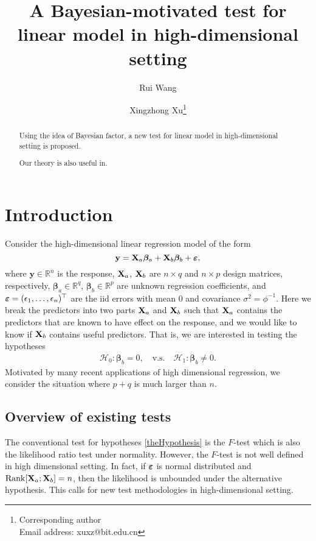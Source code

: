 \documentclass[11pt]{article}
\DeclareMathOperator{\myrank}{Rank}
\newcommand{\By}{\mathbf{y}}    \newcommand{\Bz}{\mathbf{z}}
\newcommand{\bfsym}[1]{\ensuremath{\boldsymbol{#1}}}
\def\bbeta{\bfsym \beta}
\theoremstyle{plain}
\theoremstyle{definition}
\theoremstyle{remark}
\begin{document}
\title{
A Bayesian-motivated test for linear model in high-dimensional setting
}



\author[1]{Rui Wang}
\author[1,2]{Xingzhong Xu\thanks{Corresponding author\\Email address: xuxz@bit.edu.cn}}

\maketitle
\begin{abstract}
    Using the idea of Bayesian factor, a new test for linear model in high-dimensional setting is proposed.

    Our theory is also useful in.
\end{abstract}
\section{Introduction} 
Consider the high-dimensional linear regression model of the form
\begin{equation*}
    \By = 
    \BX_a \bbeta_a + \BX_b \bbeta_b + \bepsilon, %
\end{equation*}
where $\By \in \mathbb R^n$ is the response, 
$\mathbf{X}_a$, $\mathbf{X}_b$ are $n\times q$ and $n\times p$ design matrices, respectively,  $\bbeta_a\in \mathbb R^q$, $\bbeta_b\in \mathbb R^p$ are unknown regression coefficients, and $\bepsilon=(\epsilon_1,\ldots,\epsilon_n)^\top$ are the iid errors with mean $0$ and covariance $\sigma^2=\phi^{-1}$.
Here we break the predictors into two parts $\mathbf{X}_a$ and $\mathbf{X}_b$ such that $\mathbf{X}_a$ contains the predictors that are known to have effect on the response,
and we would like to know if $\mathbf{X}_b$ contains useful predictors.
That is, we are interested in testing the hypotheses
\begin{align}\label{theHypothesis}
    \mathcal H_0:   \bbeta_b =0,\quad
    \text{v.s.} \quad
    \mathcal H_1:   \bbeta_b \neq 0.
\end{align}
Motivated by many recent applications of high dimensional regression, we consider the situation where $p+q$ is much larger than $n$.


\subsection{Overview of existing tests}
The conventional test for hypotheses \eqref{theHypothesis} is the $F$-test which is also the likelihood ratio test under normality.
However, the $F$-test is not well defined in high dimensional setting.
In fact, if $\bepsilon$ is normal distributed and $\myrank[\BX_a;\BX_b]=n$, then the likelihood is unbounded under the alternative hypothesis.
This calls for new test methodologies in high-dimensional setting.
\end{document}
